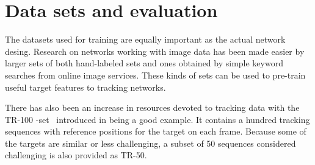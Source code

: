 \section{Data sets and evaluation}

The datasets used for training are equally important as the actual network desing. %
Research on networks working with image data has been made easier by larger sets of both
hand-labeled sets and ones obtained by simple keyword searches from online image services.
These kinds of sets can be used to pre-train useful target features to tracking networks.

There has also been an increase in resources devoted to tracking data with the
TR-100 -set~\cite{VTB} introduced in being a good example. It contains a hundred tracking
sequences with reference positions for the target on each frame. Because some of the
targets are similar or less challenging, a subset of 50 sequences considered challenging
is also provided as TR-50.~\cite{OT_BENCH}
